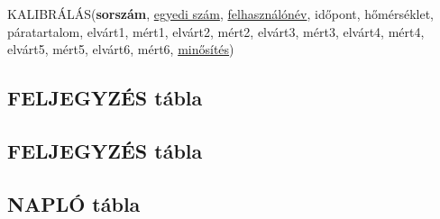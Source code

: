 \documentclass[a4paper,12pt]{report}
\newcommand{\pk}[1]{\textbf{#1}} %
\newcommand{\fk}[1]{\underline{#1}} %
\newcommand{\tabla}[1]{\noindent\MakeUppercase{#1}} %
\begin{document}
\tabla{kalibrálás}(\pk{sorszám}, \fk{egyedi szám}, \fk{felhasználónév}, időpont, hőmérséklet, páratartalom, elvárt1, mért1, elvárt2, mért2, elvárt3, mért3, elvárt4, mért4, elvárt5, mért5, elvárt6, mért6, \fk{minősítés})\\



\subsection{FELJEGYZÉS tábla}

\subsection{FELJEGYZÉS tábla}

\subsection{NAPLÓ tábla}

%
% 
\end{document}
